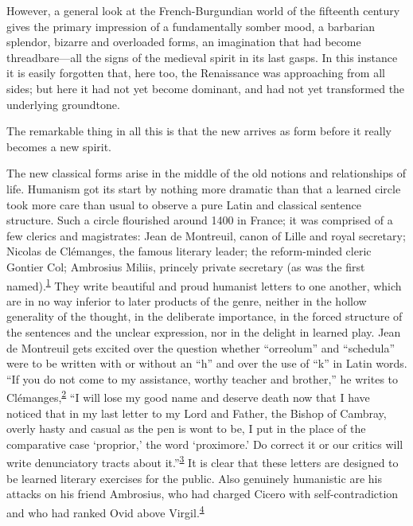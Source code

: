 However, a general look at the French-Burgundian world of the fifteenth
century gives the primary impression of a fundamentally somber mood, a
barbarian splendor, bizarre and overloaded forms, an imagination that
had become threadbare---all the signs of the medieval spirit in its last
gasps. In this instance it is easily forgotten that, here too, the
Renaissance was approaching from all sides; but here it had not yet
become dominant, and had not yet transformed the underlying groundtone.

The remarkable thing in all this is that the new arrives as form before
it really becomes a new spirit.

The new classical forms arise in the middle of the old notions and
relationships of life. Humanism got its start by nothing more dramatic
than that a learned circle took more care than usual to observe a pure
Latin and classical sentence structure. Such a circle flourished around
1400 in France; it was comprised of a few clerics and magistrates: Jean
de Montreuil, canon of Lille and royal secretary; Nicolas de Clémanges,
the famous literary leader; the reform-minded cleric Gontier Col;
Ambrosius Miliis, princely private secretary (as was the first
named).\textsuperscript{\protect\hypertarget{22_Chapter_Fourteen__THE_COMING_OF.xhtmlux5cux23id_122}{\protect\hyperlink{23_NOTES.xhtmlux5cux23id_123}{1}}}
They write beautiful and proud humanist letters to one another, which
are in no way inferior to later products of the genre, neither in the
hollow generality of the thought, in the deliberate importance, in the
forced structure of the sentences and the unclear expression, nor in the
delight in learned play. Jean de Montreuil gets excited over the
question whether ``orreolum'' and ``schedula'' were to be written with
or without an ``h'' and over the use of ``k'' in Latin words. ``If you
do not come to my assistance, worthy teacher and brother,'' he writes to
Clémanges,\textsuperscript{\protect\hypertarget{22_Chapter_Fourteen__THE_COMING_OF.xhtmlux5cux23id_120}{\protect\hyperlink{23_NOTES.xhtmlux5cux23id_121}{2}}}
``I will lose my good name and deserve death now that I have noticed
that in my last letter to my Lord and Father, the Bishop of Cambray,
overly hasty and casual as the pen is wont to be, I put in the place of
the comparative case `proprior,' the word `proximore.' Do correct it or
our critics will write denunciatory tracts about
it.''\textsuperscript{\protect\hypertarget{22_Chapter_Fourteen__THE_COMING_OF.xhtmlux5cux23id_118}{\protect\hyperlink{23_NOTES.xhtmlux5cux23id_119}{3}}}
It is clear that these letters are designed to be learned literary
exercises for the public. Also genuinely humanistic
\protect\hypertarget{22_Chapter_Fourteen__THE_COMING_OF.xhtmlux5cux23page_384}{}{}are
his attacks on his friend Ambrosius, who had charged Cicero with
self-contradiction and who had ranked Ovid above
Virgil.\textsuperscript{\protect\hypertarget{22_Chapter_Fourteen__THE_COMING_OF.xhtmlux5cux23id_116}{\protect\hyperlink{23_NOTES.xhtmlux5cux23id_117}{4}}}

